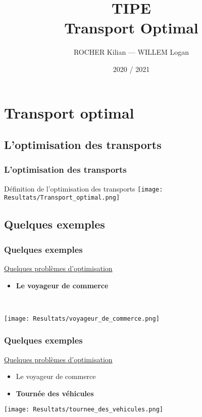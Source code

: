 \documentclass[10pt]{beamer}
\title[TIPE — Transport Optimal]{TIPE \\ Transport Optimal}
\author{ROCHER Kilian — WILLEM Logan}
\date{2020 / 2021}
\begin{document}
	\begin{frame}[plain]
		\maketitle
	\end{frame}

	\begin{frame}[plain]
		\tableofcontents
	\end{frame}

	\section{Transport optimal}
	
	\subsection{L'optimisation des transports}
	
	\begin{frame}
		\frametitle{L'optimisation des transports}
		Définition de l'optimisation des transports
		\texttt{[image: Resultats/Transport\_optimal.png]}
	\end{frame}
	
	\subsection{Quelques exemples}
	
	\begin{frame}
		\frametitle{Quelques exemples}
		\underline{Quelques problèmes d'optimisation}
		\pause
		\begin{itemize}[label=—]
			\item \textbf{Le voyageur de commerce}
		\end{itemize}
		\ \\
		\begin{center}
			\texttt{[image: Resultats/voyageur\_de\_commerce.png]}
		\end{center}
	\end{frame}

	\begin{frame}
		\frametitle{Quelques exemples}
		\underline{Quelques problèmes d'optimisation}
		\begin{itemize}[label=—]
			\item Le voyageur de commerce
			\item \textbf{Tournée des véhicules}
		\end{itemize}
		\begin{center}
			\texttt{[image: Resultats/tournee\_des\_vehicules.png]}
		\end{center}
	\end{frame}
\end{document}
